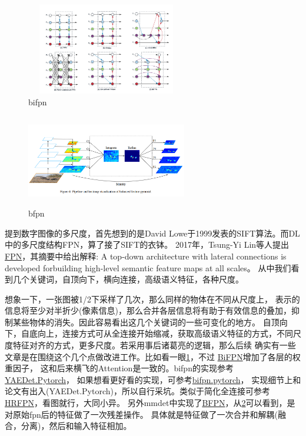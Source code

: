 \documentclass[UTF8]{ctexart}
\begin{document}
\begin{figure}[htbp]
	\centering
	\includegraphics[width=7cm,height=4cm]{./pic/BiFPN.png}
	\caption{bifpn}
	\label{picbifpn}
\end{figure}

\begin{figure}[htbp]
	\centering
	\includegraphics[width=7cm,height=4cm]{./pic/BFPN.png}
	\caption{bfpn}
	\label{picbfpn}
\end{figure}

提到数字图像的多尺度，首先想到的是David Lowe于1999发表的SIFT算法。而DL中的多尺度结构FPN，算了接了SIFT的衣钵。
2017年，Tsung-Yi Lin等人提出\href{https://arxiv.org/abs/1612.03144}{FPN}，其摘要中给出解释:
A top-down architecture with lateral connections is developed forbuilding high-level semantic feature maps at all scales。
从中我们看到几个关键词，自顶向下，横向连接，高级语义特征，各种尺度。

想象一下，一张图被1/2下采样了几次，那么同样的物体在不同从尺度上，
表示的信息将至少对半折少(像素信息)，那么合并各层信息将有助于有效信息的叠加，抑制某些物体的消失。因此容易看出这几个关键词的一些可变化的地方。
自顶向下，自底向上，连接方式可从全连接开始缩减，获取高级语义特征的方式，不同尺度特征对齐的方式，更多尺度。若采用事后诸葛亮的逻辑，那么后续
确实有一些文章是在围绕这个几个点做改进工作。比如看一眼\ref{picbifpn}，不过 \href{https://arxiv.org/abs/1911.09070}{BiFPN}增加了各层的权重因子，
这和后来横飞的Attention是一致的。bifpn的实现参考\href{https://github.com/zylo117/Yet-Another-EfficientDet-Pytorch}{YAEDet.Pytorch}，
如果想看更好看的实现，可参考\href{https://github.com/toandaominh1997/EfficientDet.Pytorch/blob/master/models/bifpn.py}{bifpn.pytorch}，
实现细节上和论文有出入(YAEDet.Pytorch)，所以自行采坑。类似于简化全连接可参考\href{https://arxiv.org/abs/1904.04514}{HRFPN}，看图就行，大同小异。
另外mmdet中实现了\href{https://arxiv.org/pdf/1904.02701.pdf}{BFPN}，从\ref{picbfpn}可以看到，是对原始fpn后的特征做了一次残差操作。
具体就是特征做了一次合并和解耦(融合，分离)，然后和输入特征相加。
\end{document}
